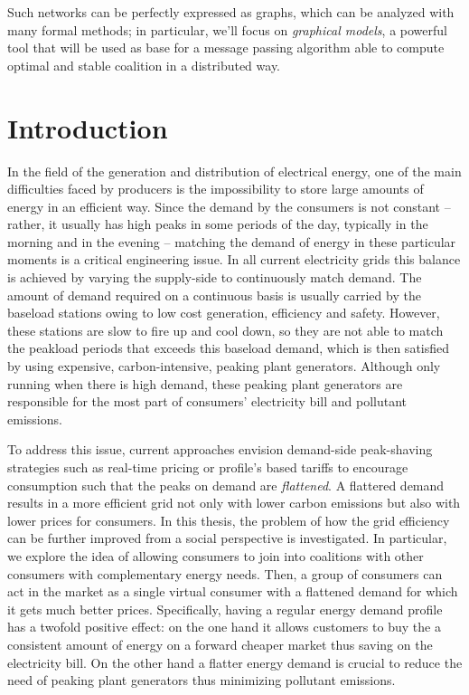 \documentclass[11pt, twoside, titlepage, a4paper, openright]{report}
\begin{document}
Such networks can be perfectly expressed as graphs, which can be analyzed with many formal methods; in particular, we'll focus on \textit{graphical models}, a powerful tool that will be used as base for a message passing algorithm able to compute optimal and stable coalition in a distributed way.



\chapter{Introduction}\label{chap:intro}

In the field of the generation and distribution of electrical energy, one of the main difficulties faced by producers is the impossibility to store large amounts of energy in an efficient way. Since the demand by the consumers is not constant -- rather, it usually has high peaks in some periods of the day, typically in the morning and in the evening -- matching the demand of energy in these particular moments is a critical engineering issue.
In all current electricity grids this balance is
achieved by varying the supply-side to continuously match demand.
The amount of demand required on a continuous basis is usually carried by the
baseload stations owing to low cost generation, efficiency and safety. 
However,
these stations are slow to fire up and cool down, so they are not able to match
the peakload periods that exceeds this baseload demand, which is then satisfied by using expensive, carbon-intensive, peaking plant generators.
Although only running when there is high demand, these peaking plant generators are responsible for the most part of consumers'
electricity bill and pollutant emissions.

To address this issue, current approaches envision demand-side peak-shaving
strategies such as real-time pricing or profile's based tariffs to encourage
consumption such that the peaks on demand are \emph{flattened}. A flattered demand results in a more efficient grid not only
with lower carbon emissions but also with lower prices for
consumers. 
In this thesis, the problem of how the grid efficiency can be
further improved from a social perspective is investigated. In particular, we explore the
idea of allowing consumers to join into coalitions with other consumers with
complementary energy needs. Then, a group of consumers can act in the market
as a single virtual consumer with a flattened demand for which it gets much better
prices. Specifically, having a regular energy demand profile has a twofold positive effect: on the one hand it allows customers to buy the a consistent amount of energy on a forward cheaper market thus saving on the electricity bill. On the other hand a flatter energy demand is crucial to reduce the need of peaking plant generators thus minimizing pollutant emissions.
\end{document}
